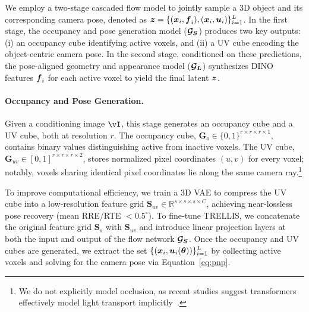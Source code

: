\documentclass[../../book-main.tex]{subfiles}
\begin{document}
We employ a two-stage cascaded flow model to jointly sample a 3D
object and its corresponding camera pose, denoted as $\boldsymbol{z} = \{
(\boldsymbol{x}_i, \boldsymbol{f}_i), (\boldsymbol{x}_i,\boldsymbol{u}_i) \}_{i=1}^{L}$. In
the first stage, the occupancy and pose generation model ($\boldsymbol{\mathcal{G}_{S}}$)
produces two key outputs: (i) an occupancy cube identifying active
voxels, and (ii) a UV cube encoding the object-centric camera pose.
In the second stage, conditioned on these predictions, the
pose-aligned geometry and appearance model ($\boldsymbol{\mathcal{G}_{L}}$) synthesizes
DINO~\citep{oquab2023dinov2} features $\boldsymbol{f}_i$ for each active voxel
to yield the final latent $\boldsymbol{z}$.

\paragraph{Occupancy and Pose Generation.}
Given a conditioning image \(\image\), this stage generates an
occupancy cube and a UV cube, both at resolution $r$. The occupancy
cube, \(\boldsymbol{G}_o \in \{0,1\}^{r \times r \times r \times
1}\), contains binary values distinguishing active from inactive
voxels. The UV cube, \(\boldsymbol{G}_{uv} \in [0,1]^{r \times r
\times r \times 2}\), stores normalized pixel coordinates $(u,v)$ for
every voxel; notably, voxels sharing identical pixel coordinates lie
along the same camera ray.\footnote{We do not explicitly model
occlusion, as recent studies suggest transformers effectively model
light transport implicitly~\citep{jin2024lvsm, zeng2025renderformer}.}

To improve computational efficiency, we train a 3D VAE to compress
the UV cube into a low-resolution feature grid \(\boldsymbol{S}_{uv}
\in \mathbb{R}^{s\times s\times s \times C}\), achieving
near-lossless pose recovery (mean RRE/RTE $< 0.5^\circ$). To
fine-tune TRELLIS, we concatenate the original feature grid
\(\boldsymbol{S}_o\) with \(\boldsymbol{S}_{uv}\) and introduce
linear projection layers at both the input and output of the flow
network $\boldsymbol{\mathcal{G}_{S}}$. Once the occupancy and UV cubes are generated, we
extract the set $\{ (\boldsymbol{x}_i, \boldsymbol{u}_i(\boldsymbol{\theta}))
\}_{i=1}^{L}$ by collecting active voxels and solving for the
camera pose via Equation~\ref{eq:pnp}.

\end{document}
